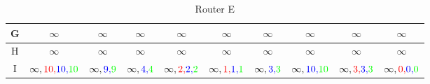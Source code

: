 \documentclass[a4paper,10pt]{article}
\begin{document}
\begin{table}[H]
\begin{tabular}{|c|c|c|c|c|c|c|c|c|c|}
G & $\infty$ & $\infty $ & $\infty $ & $ \infty$ & $ \infty$ & $\infty $ & $\infty $ & $\infty $ & $ \infty$ \\\hline
H & $\infty$ & $\infty$ & $\infty $ & $ \infty$ & $ \infty$ & $\infty $ & $\infty $ & $\infty$ & $ \infty$ \\\hline
I & $ \infty,{\color{red}10,}{\color{blue}10,}{\color{green}10}$ & $\infty,{\color{blue}9,}{\color{green}9} $ & $\infty,{\color{blue}4,}{\color{green}4} $ & $ \infty,{\color{red}2,}{\color{blue}2,}{\color{green}2}$ & $ \infty,{\color{red}1,}{\color{blue}1,}{\color{green}1}$ & $\infty,{\color{blue}3,}{\color{green}3} $ & $ \infty,{\color{blue}10,}{\color{green}10}$ & $ \infty,{\color{red}3,}{\color{blue}3,}{\color{green}3}$ & $ \infty,{\color{red}0,}{\color{blue}0,}{\color{green}0}$ \\\hline
\end{tabular}
\caption{Router E}
\end{table} \\
\end{document}
